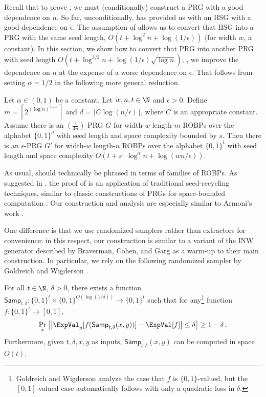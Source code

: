 Recall that to prove , we must (conditionally) construct a PRG with a good dependence on $n$. So far, unconditionally,  has provided us with an HSG with a good dependence on $\epsilon$. The assumption of  allows us to convert that HSG into a PRG with the same seed length, $O(t + \log^2 n + \log(1/\epsilon))$ (for width $w$, a constant). In this section, we show how to convert that PRG into another PRG with seed length $O(t + \log^{3/2} n + \log(1/\epsilon) \sqrt{\log n})$, \ie, we improve the dependence on $n$ at the expense of a worse dependence on $\epsilon$. That follows from setting $\alpha = 1/2$ in the following more general reduction.
\begin{lemma} \label{lem:armoni}
Let $\alpha \in (0, 1)$ be a constant. Let $w, n, t \in \N$ and $\epsilon > 0$. Define $m = \left\lceil2^{(\log n)^{1 - \alpha}}\right\rceil$ and $d =  \lceil C\log(n/\epsilon) \rceil$, where $C$ is an appropriate constant. Assume there is an $(\frac{\epsilon}{4n})$-PRG $G$ for width-$w$ length-$m$ ROBPs over the alphabet $\{0, 1\}^d$ with seed length and space complexity bounded by $s$. Then there is an $\epsilon$-PRG $G'$ for width-$w$ length-$n$ ROBPs over the alphabet $\{0, 1\}^t$ with seed length and space complexity $O(t + s \cdot \log^{\alpha} n + \log(wn/\epsilon))$.
\end{lemma}

As usual,  should technically be phrased in terms of families of ROBPs. As suggested in , the proof of  is an application of traditional seed-recycling techniques, similar to classic constructions of PRGs for space-bounded computation \cite{Nis92, INW94, NZ96}. Our construction and analysis are especially similar to Armoni's work \cite{Arm98}.

One difference is that we use randomized samplers rather than extractors for convenience; in this respect, our construction is similar to a variant of the INW generator \cite{INW94} described by Braverman, Cohen, and Garg \cite{BCG20} as a warm-up to their main construction. In particular, we rely on the following randomized sampler by Goldreich and Wigderson \cite{GW97}.

\begin{theorem}[{\cite[Lemma 6.6]{GW97}}] \label{thm:gw}
For all $t \in \N$, $\delta > 0$, there exists a function $\mathsf{Samp}_{t, \delta} \colon \{0, 1\}^t \times \{0, 1\}^{O(\log(1/\delta))} \to \{0, 1\}^t$ such that for any\footnote{Goldreich and Wigderson analyze the case that $f$ is $\{0, 1\}$-valued, but the $[0, 1]$-valued case automatically follows with only a quadratic loss in $\delta$.} function $f \colon \{0, 1\}^t \to [0, 1]$,
$$
\Pr_x\left[\left|\ExpVal_y[f(\mathsf{Samp}_{t, \delta}(x, y))] - \ExpVal[f]\right| \leq \delta\right] \geq 1 - \delta\,.
$$
Furthermore, given $t, \delta, x, y$ as inputs, $\mathsf{Samp}_{t, \delta}(x, y)$ can be computed in space $O(t)$.
\end{theorem}

